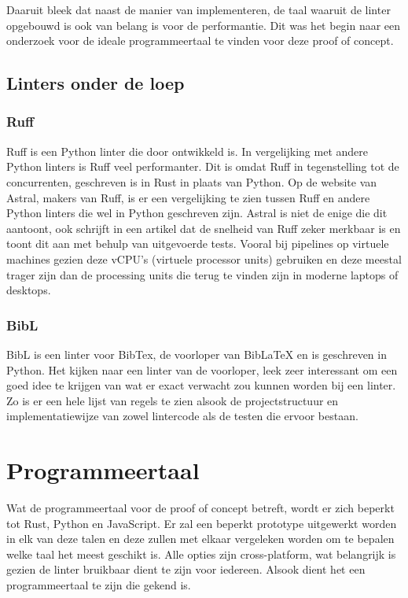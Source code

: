 Daaruit bleek dat naast de manier van implementeren, de taal waaruit de linter opgebouwd is ook van belang is voor de performantie. Dit was het begin naar een onderzoek voor de ideale programmeertaal te vinden voor deze proof of concept. 

\subsection{Linters onder de loep}
\subsubsection{Ruff}
Ruff is een Python linter die door \textcite{Astral2024} ontwikkeld is. In vergelijking met andere Python linters is Ruff veel performanter. Dit is omdat Ruff in tegenstelling tot de concurrenten, geschreven is in Rust in plaats van Python. Op de website van Astral, makers van Ruff, is er een vergelijking te zien tussen Ruff en andere Python linters die wel in Python geschreven zijn. Astral is niet de enige die dit aantoont, ook \textcite{TurnerTrauring2023} schrijft in een artikel dat de snelheid van Ruff zeker merkbaar is en toont dit aan met behulp van uitgevoerde tests. Vooral bij pipelines op virtuele machines gezien deze vCPU's (virtuele processor units) gebruiken en deze meestal trager zijn dan de processing units die terug te vinden zijn in moderne laptops of desktops.

\subsubsection{BibL}
BibL is een linter voor BibTex, de voorloper van BibLaTeX en is geschreven in Python. Het kijken naar een linter van de voorloper, leek zeer interessant om een goed idee te krijgen van wat er exact verwacht zou kunnen worden bij een linter. Zo is er een hele lijst van regels te zien alsook de projectstructuur en implementatiewijze van zowel lintercode als de testen die ervoor bestaan.\autocite{VanDenKerchove2020}

\section{Programmeertaal}

Wat de programmeertaal voor de proof of concept betreft, wordt er zich beperkt tot Rust, Python en JavaScript. Er zal een beperkt prototype uitgewerkt worden in elk van deze talen en deze zullen met elkaar vergeleken worden om te bepalen welke taal het meest geschikt is. Alle opties zijn cross-platform, wat belangrijk is gezien de linter bruikbaar dient te zijn voor iedereen. Alsook dient het een programmeertaal te zijn die gekend is.

